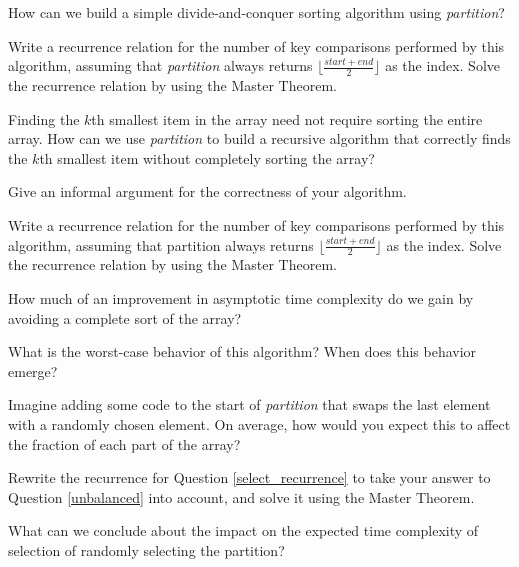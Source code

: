 \documentclass{tufte-handout}
\begin{document}
\begin{questions}
How can we build a simple divide-and-conquer sorting algorithm using \emph{partition}? 

\item Write a recurrence relation for the number of key comparisons performed by this algorithm, assuming that \emph{partition} always returns $\lfloor \frac{start + end}{2} \rfloor$ as the index. Solve the recurrence relation by using the Master Theorem. 

\item Finding the $k$th smallest item in the array need not require sorting the entire array. How can we use \emph{partition} to build a recursive algorithm that correctly finds the $k$th smallest item without completely sorting the array? \label{select_question}

\item Give an informal argument for the correctness of your algorithm.

\item Write a recurrence relation for the number of key comparisons performed by this algorithm, assuming that partition always returns $\lfloor \frac{start + end}{2} \rfloor$ as the index. Solve the recurrence relation by using the Master Theorem. \label{select_recurrence}

\item How much of an improvement in asymptotic time complexity do we gain by avoiding a complete sort of the array?

\item What is the worst-case behavior of this algorithm? When does this behavior emerge?

\item Imagine adding some code to the start of \emph{partition} that swaps the last element with a randomly chosen element. On average, how would you expect this to affect the fraction of each part of the array? \label{unbalanced}

\item Rewrite the recurrence for Question \ref{select_recurrence} to take your answer to Question \ref{unbalanced} into account, and solve it using the Master Theorem.

\item What can we conclude about the impact on the expected time complexity of selection of randomly selecting the partition?


\end{questions}
\end{document}
